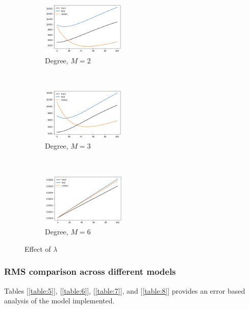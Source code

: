 \begin{figure}[!ht]
    \centering
    \begin{subfigure}[t]{0.25\textwidth}
        \centering
        \includegraphics[height=1in]{Task 2 Images/batch500_deg2_lambda.png}
        \caption{Degree, $M = 2$}
    \end{subfigure}%
    ~ 
    \begin{subfigure}[t]{0.25\textwidth}
        \centering
        \includegraphics[height=1in]{Task 2 Images/batch500_deg3_lambda.png}
        \caption{Degree, $M = 3$ }
    \end{subfigure}%
    ~
    \begin{subfigure}[t]{0.25\textwidth}
        \centering
        \includegraphics[height=1in]{Task 2 Images/batch500_deg6_lambda1to100.png}
        \caption{ Degree, $M = 6$}
    \end{subfigure}
    \caption{Effect of $\lambda$}
    \label{fig:11}
\end{figure}





\subsubsection{RMS comparison across different models}

Tables [\ref{table:5}], [\ref{table:6}], [\ref{table:7}], and [\ref{table:8}] provides an error based analysis of the model implemented.

